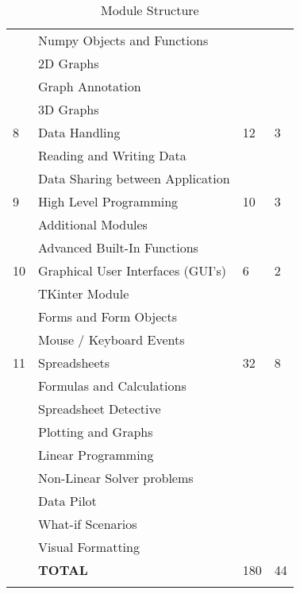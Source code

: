 \begin{longtable}{|p{1.4cm}|p{8.4cm}|p{2.2cm}|p{1.8cm}|}
                & \qquad Numpy Objects and Functions         &    &    \\
                & \qquad 2D Graphs                           &    &    \\
                & \qquad Graph Annotation                    &    &    \\
                & \qquad 3D Graphs                           &    &    \\
             \hline
             8  & Data Handling                              & 12 & 3  \\
                & \qquad Reading and Writing Data            &    &    \\
                & \qquad Data Sharing between Application    &    &    \\
             \hline
             9  & High Level Programming                     & 10 & 3  \\
                & \qquad Additional Modules                  &    &    \\
                & \qquad Advanced Built-In Functions         &    &    \\
             \hline
             10 & Graphical User Interfaces (GUI's)          &  6 & 2  \\
                & \qquad TKinter Module                      &    &    \\
                & \qquad Forms and Form Objects              &    &    \\
                & \qquad Mouse / Keyboard Events             &    &    \\
             \hline
             11 & Spreadsheets                               & 32 & 8  \\
                & \qquad Formulas and Calculations           &    &    \\
                & \qquad Spreadsheet Detective               &    &    \\
                & \qquad Plotting and Graphs                 &    &    \\
                & \qquad Linear Programming                  &    &    \\
                & \qquad Non-Linear Solver problems          &    &    \\
                & \qquad Data Pilot                          &    &    \\
                & \qquad What-if Scenarios                   &    &    \\
                & \qquad Visual Formatting                   &    &    \\
             \hline
                & {\bf TOTAL}                                &180 & 44 \\
             \hline

             \caption[Module Structure]{Module Structure} \label{tab:study_comp} \\
        \end{longtable}

